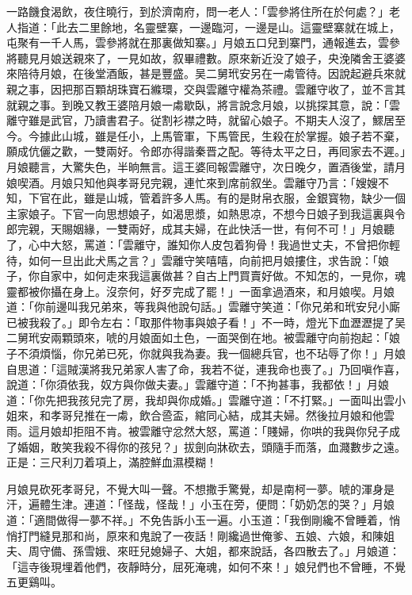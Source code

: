 一路饑食渴飲，夜住曉行，到於濟南府，問一老人：「雲參將住所在於何處？」老人指道：「此去二里餘地，名靈壁寨，一邊臨河，一邊是山。這靈壁寨就在城上，屯聚有一千人馬，雲參將就在那裏做知寨。」月娘五口兒到寨門，通報進去，雲參將聽見月娘送親來了，一見如故，叙畢禮數。原來新近没了娘子，央浼隣舍王婆婆來陪待月娘，在後堂酒飯，甚是豐盛。吴二舅玳安另在一䖏管待。因說起避兵來就親之事，因把那百顆胡珠寶石縧環，交與雲離守權為茶禮。雲離守收了，並不言其就親之事。到晚又教王婆陪月娘一䖏歇臥，將言說念月娘，以挑探其意，說：「雲離守雖是武官，乃讀書君子。従割衫襟之時，就留心娘子。不期夫人沒了，鰥居至今。今據此山城，雖是任小，上馬管軍，下馬管民，生殺在於掌握。娘子若不棄，願成伉儷之歡，一雙兩好。令郎亦得諧秦晋之配。等待太平之日，再囘家去不遲。」月娘聽言，大驚失色，半晌無言。這王婆囘報雲離守，次日晚夕，置酒後堂，請月娘喫酒。月娘只知他與孝哥兒完親，連忙來到席前叙坐。雲離守乃言：「嫂嫂不知，下官在此，雖是山城，管着許多人馬。有的是財帛衣服，金銀寳物，缺少一個主家娘子。下官一向思想娘子，如渴思漿，如熱思凉，不想今日娘子到我這裏與令郎完親，天賜姻緣，一雙兩好，成其夫婦，在此快活一世，有何不可！」月娘聽了，心中大怒，罵道：「雲離守，誰知你人皮包着狗骨！我過世丈夫，不曾把你輕待，如何一旦出此犬馬之言？」雲離守笑嘻嘻，向前把月娘摟住，求告說：「娘子，你自家中，如何走來我這裏做甚？自古上門買賣好做。不知怎的，一見你，魂靈都被你攝在身上。沒奈何，好歹完成了罷！」一面拿過酒來，和月娘喫。月娘道：「你前邊叫我兄弟來，等我與他說句話。」雲離守笑道：「你兄弟和玳安兒小廝已被我殺了。」即令左右：「取那件物事與娘子看！」不一時，燈光下血瀝瀝提了吴二舅玳安兩顆頭來，唬的月娘面如土色，一面哭倒在地。被雲離守向前抱起：「娘子不須煩惱，你兄弟已死，你就與我為妻。我一個總兵官，也不玷辱了你！」月娘自思道：「這賊漢將我兄弟家人害了命，我若不従，連我命也喪了。」乃回嗔作喜，說道：「你須依我，奴方與你做夫妻。」雲離守道：「不拘甚事，我都依！」月娘道：「你先把我孩兒完了房，我却與你成婚。」雲離守道：「不打緊。」一面叫出雲小姐來，和孝哥兒推在一䖏，飲合巹盃，綰同心結，成其夫婦。然後拉月娘和他雲雨。這月娘却拒阻不肯。被雲離守忿然大怒，罵道：「賤婦，你哄的我與你兒子成了婚姻，敢笑我殺不得你的孩兒？」拔劍向牀砍去，頭隨手而落，血濺數步之遠。正是：三尺利刀着項上，滿腔鮮血濕模糊！

月娘見砍死孝哥兒，不覺大叫一聲。不想撒手驚覺，却是南柯一夢。唬的渾身是汗，遍體生津。連道：「怪哉，怪哉！」小玉在旁，便問：「奶奶怎的哭？」月娘道：「適間做得一夢不祥。」不免告訴小玉一遍。小玉道：「我倒剛纔不曾睡着，悄悄打門縫見那和尚，原來和鬼說了一夜話！剛纔過世俺爹、五娘、六娘，和陳姐夫、周守備、孫雪娥、來旺兒媳婦子、大姐，都來說話，各四散去了。」月娘道：「這寺後現埋着他們，夜靜時分，屈死淹魂，如何不來！」娘兒們也不曾睡，不覺五更鷄叫。

